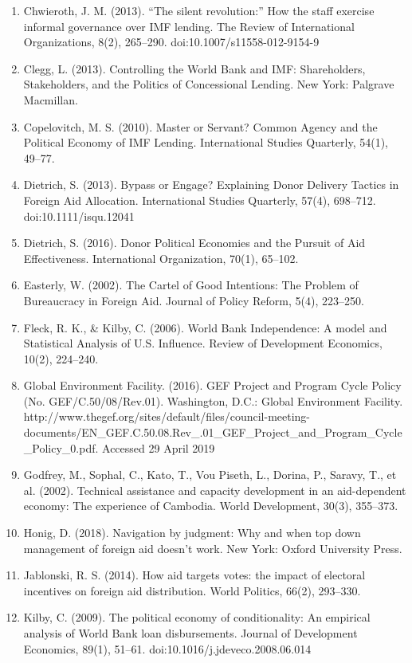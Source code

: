 \documentclass{article}
\begin{document}
\begin{singlespace}
\begin{enumerate}
	\item Chwieroth, J. M. (2013). “The silent revolution:” How the staff exercise informal governance over IMF lending. The Review of International Organizations, 8(2), 265–290. doi:10.1007/s11558-012-9154-9
	\item Clegg, L. (2013). Controlling the World Bank and IMF: Shareholders, Stakeholders, and the Politics of Concessional Lending. New York: Palgrave Macmillan.
	\item Copelovitch, M. S. (2010). Master or Servant? Common Agency and the Political Economy of IMF Lending. International Studies Quarterly, 54(1), 49–77.
	\item Dietrich, S. (2013). Bypass or Engage? Explaining Donor Delivery Tactics in Foreign Aid Allocation. International Studies Quarterly, 57(4), 698–712. doi:10.1111/isqu.12041
	\item Dietrich, S. (2016). Donor Political Economies and the Pursuit of Aid Effectiveness. International Organization, 70(1), 65–102.
	\item Easterly, W. (2002). The Cartel of Good Intentions: The Problem of Bureaucracy in Foreign Aid. Journal of Policy Reform, 5(4), 223–250.
	\item Fleck, R. K., \& Kilby, C. (2006). World Bank Independence: A model and Statistical Analysis of U.S. Influence. Review of Development Economics, 10(2), 224–240.
	\item Global Environment Facility. (2016). GEF Project and Program Cycle Policy (No. GEF/C.50/08/Rev.01). Washington, D.C.: Global Environment Facility. http://www.thegef.org/sites/default/files/council-meeting-documents/EN\_GEF.C.50.08.Rev\_.01\_GEF\_Project\_and\_Program\_Cycle\_Policy\_0.pdf. Accessed 29 April 2019	
	\item Godfrey, M., Sophal, C., Kato, T., Vou Piseth, L., Dorina, P., Saravy, T., et al. (2002). Technical assistance and capacity development in an aid-dependent economy: The experience of Cambodia. World Development, 30(3), 355–373.
	\item Honig, D. (2018). Navigation by judgment: Why and when top down management of foreign aid doesn’t work. New York: Oxford University Press.
	\item Jablonski, R. S. (2014). How aid targets votes: the impact of electoral incentives on foreign aid distribution. World Politics, 66(2), 293–330.
	\item Kilby, C. (2009). The political economy of conditionality: An empirical analysis of World Bank loan disbursements. Journal of Development Economics, 89(1), 51–61. doi:10.1016/j.jdeveco.2008.06.014

\end{enumerate}
\end{singlespace}
\end{document}
